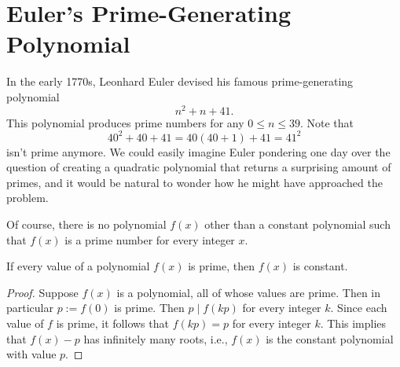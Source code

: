 \section{Euler's Prime-Generating Polynomial}

In the early 1770s, Leonhard Euler devised his famous prime-generating polynomial
\begin{equation*}
  n^2 + n + 41.
\end{equation*}
This polynomial produces prime numbers for any $0\leq n \leq 39$. Note that
\begin{equation*}
  40^2 + 40 + 41 = 40(40+1) + 41 = 41^2
\end{equation*}
isn't prime anymore. We could easily imagine Euler pondering one day over the question of creating a quadratic polynomial that returns a surprising amount of primes, and it would be natural to wonder how he might have approached the problem.

Of course, there is no polynomial $f(x)$ other than a constant polynomial such that $f(x)$ is a prime number for every integer $x$.

\begin{proposition}
  If every value of a polynomial $f(x)$ is prime, then $f(x)$ is constant.
\end{proposition}

\begin{proof}
  Suppose $f(x)$ is a polynomial, all of whose values are prime. Then in particular $p:=f(0)$ is prime. Then $p\mid f(kp)$ for every integer $k$. Since each value of $f$ is prime, it follows that $f(kp)=p$ for every integer $k$. This implies that $f(x)-p$ has infinitely many roots, i.e., $f(x)$ is the constant polynomial with value $p$.
\end{proof}

